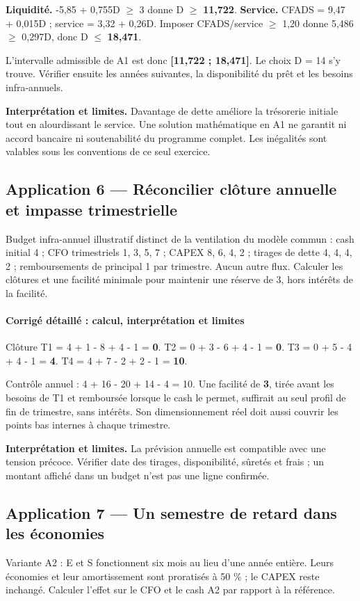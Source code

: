 \documentclass[12pt,a4paper]{article}
\begin{document}
\textbf{Liquidité.} -5,85 + 0,755D $\geq$ 3 donne D $\geq$ \textbf{11,722}. \textbf{Service.} CFADS = 9,47 + 0,015D ; service = 3,32 + 0,26D. Imposer CFADS/service $\geq$ 1,20 donne 5,486 $\geq$ 0,297D, donc D $\leq$ \textbf{18,471}.

L’intervalle admissible de A1 est donc \textbf{[11,722 ; 18,471]}. Le choix D = 14 s’y trouve. Vérifier ensuite les années suivantes, la disponibilité du prêt et les besoins infra-annuels.

\textbf{Interprétation et limites.} Davantage de dette améliore la trésorerie initiale tout en alourdissant le service. Une solution mathématique en A1 ne garantit ni accord bancaire ni soutenabilité du programme complet. Les inégalités sont valables sous les conventions de ce seul exercice.


\subsection*{Application 6 --- Réconcilier clôture annuelle et impasse trimestrielle}
Budget infra-annuel illustratif distinct de la ventilation du modèle commun : cash initial 4 ; CFO trimestriels 1, 3, 5, 7 ; CAPEX 8, 6, 4, 2 ; tirages de dette 4, 4, 4, 2 ; remboursements de principal 1 par trimestre. Aucun autre flux. Calculer les clôtures et une facilité minimale pour maintenir une réserve de 3, hors intérêts de la facilité.


\paragraph{Corrigé détaillé : calcul, interprétation et limites}
Clôture T1 = 4 + 1 - 8 + 4 - 1 = \textbf{0}. T2 = 0 + 3 - 6 + 4 - 1 = \textbf{0}. T3 = 0 + 5 - 4 + 4 - 1 = \textbf{4}. T4 = 4 + 7 - 2 + 2 - 1 = \textbf{10}.

Contrôle annuel : 4 + 16 - 20 + 14 - 4 = 10. Une facilité de \textbf{3}, tirée avant les besoins de T1 et remboursée lorsque le cash le permet, suffirait au seul profil de fin de trimestre, sans intérêts. Son dimensionnement réel doit aussi couvrir les points bas internes à chaque trimestre.

\textbf{Interprétation et limites.} La prévision annuelle est compatible avec une tension précoce. Vérifier date des tirages, disponibilité, sûretés et frais ; un montant affiché dans un budget n’est pas une ligne confirmée.


\subsection*{Application 7 --- Un semestre de retard dans les économies}
Variante A2 : E et S fonctionnent six mois au lieu d’une année entière. Leurs économies et leur amortissement sont proratisés à 50 \% ; le CAPEX reste inchangé. Calculer l’effet sur le CFO et le cash A2 par rapport à la référence.
\end{document}
